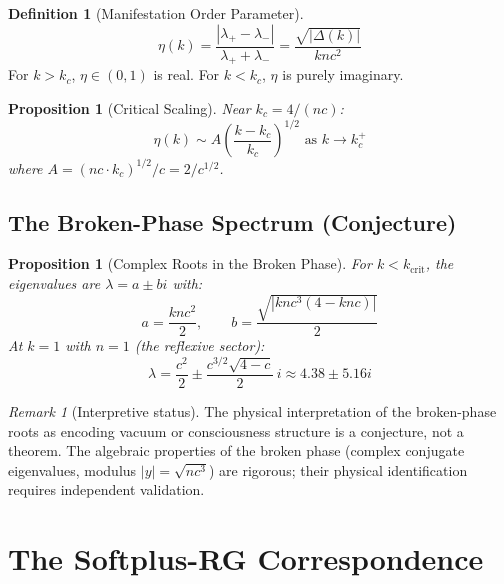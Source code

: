 \documentclass[12pt]{article}
\newtheorem{proposition}[theorem]{Proposition}
\theoremstyle{definition}
\newtheorem{definition}{Definition}[section]
\theoremstyle{remark}
\newtheorem{remark}{Remark}[section]
\begin{document}
\begin{definition}[Manifestation Order Parameter]
\label{def:order_param}
\begin{equation}
    \eta(k) = \frac{|\lambda_+ - \lambda_-|}{\lambda_+ + \lambda_-} = \frac{\sqrt{|\Delta(k)|}}{knc^2}
\end{equation}
For $k > k_c$, $\eta \in (0,1)$ is real. For $k < k_c$, $\eta$ is purely imaginary.
\end{definition}

\begin{proposition}[Critical Scaling]
Near $k_c = 4/(nc)$:
\begin{equation}
    \eta(k) \sim A\left(\frac{k - k_c}{k_c}\right)^{1/2} \text{ as } k \to k_c^+
\end{equation}
where $A = (nc \cdot k_c)^{1/2}/c = 2/c^{1/2}$.
\end{proposition}

\subsection{The Broken-Phase Spectrum (Conjecture)}

\begin{proposition}[Complex Roots in the Broken Phase]
\label{prop:broken}
For $k < k_{\text{crit}}$, the eigenvalues are $\lambda = a \pm bi$ with:
\begin{equation}
    a = \frac{knc^2}{2}, \qquad b = \frac{\sqrt{|knc^3(4 - knc)|}}{2}
\end{equation}
At $k = 1$ with $n = 1$ (the reflexive sector):
\begin{equation}
    \lambda = \frac{c^2}{2} \pm \frac{c^{3/2}\sqrt{4 - c}}{2}\,i \approx 4.38 \pm 5.16i
\end{equation}
\end{proposition}

\begin{remark}[Interpretive status]
The physical interpretation of the broken-phase roots as encoding vacuum or consciousness structure \cite{Anon2026_Zenodo} is a conjecture, not a theorem. The algebraic properties of the broken phase (complex conjugate eigenvalues, modulus $|y| = \sqrt{nc^3}$) are rigorous; their physical identification requires independent validation.
\end{remark}

\section{The Softplus-RG Correspondence}
\label{sec:rg}
\end{document}
